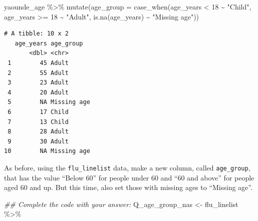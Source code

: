 \documentclass[
  letterpaper,
  DIV=11,
  numbers=noendperiod]{scrreprt}
\newenvironment{Shaded}{\begin{snugshade}}{\end{snugshade}}
\newcommand{\AttributeTok}[1]{\textcolor[rgb]{0.40,0.45,0.13}{#1}}
\newcommand{\DecValTok}[1]{\textcolor[rgb]{0.68,0.00,0.00}{#1}}
\newcommand{\DocumentationTok}[1]{\textcolor[rgb]{0.37,0.37,0.37}{\textit{#1}}}
\newcommand{\FunctionTok}[1]{\textcolor[rgb]{0.28,0.35,0.67}{#1}}
\newcommand{\NormalTok}[1]{\textcolor[rgb]{0.00,0.23,0.31}{#1}}
\newcommand{\OtherTok}[1]{\textcolor[rgb]{0.00,0.23,0.31}{#1}}
\newcommand{\SpecialCharTok}[1]{\textcolor[rgb]{0.37,0.37,0.37}{#1}}
\newcommand{\StringTok}[1]{\textcolor[rgb]{0.13,0.47,0.30}{#1}}
\begin{document}
\begin{Shaded}
\begin{Highlighting}[]
\NormalTok{yaounde\_age }\SpecialCharTok{\%\textgreater{}\%}  
  \FunctionTok{mutate}\NormalTok{(}\AttributeTok{age\_group =} \FunctionTok{case\_when}\NormalTok{(age\_years }\SpecialCharTok{\textless{}} \DecValTok{18} \SpecialCharTok{\textasciitilde{}} \StringTok{"Child"}\NormalTok{, }
\NormalTok{                               age\_years }\SpecialCharTok{\textgreater{}=} \DecValTok{18} \SpecialCharTok{\textasciitilde{}} \StringTok{"Adult"}\NormalTok{, }
                               \FunctionTok{is.na}\NormalTok{(age\_years) }\SpecialCharTok{\textasciitilde{}} \StringTok{"Missing age"}\NormalTok{))}
\end{Highlighting}
\end{Shaded}

\begin{verbatim}
# A tibble: 10 x 2
   age_years age_group  
       <dbl> <chr>      
 1        45 Adult      
 2        55 Adult      
 3        23 Adult      
 4        20 Adult      
 5        NA Missing age
 6        17 Child      
 7        13 Child      
 8        28 Adult      
 9        30 Adult      
10        NA Missing age
\end{verbatim}

\begin{tcolorbox}[enhanced jigsaw, title=\textcolor{quarto-callout-tip-color}{\faLightbulb}\hspace{0.5em}{Practice}, colbacktitle=quarto-callout-tip-color!10!white, leftrule=.75mm, arc=.35mm, opacityback=0, bottomrule=.15mm, rightrule=.15mm, toptitle=1mm, breakable, toprule=.15mm, colback=white, coltitle=black, colframe=quarto-callout-tip-color-frame, bottomtitle=1mm, titlerule=0mm, left=2mm, opacitybacktitle=0.6]

As before, using the \texttt{flu\_linelist} data, make a new column,
called \texttt{age\_group}, that has the value ``Below 60'' for people
under 60 and ``60 and above'' for people aged 60 and up. But this time,
also set those with missing ages to ``Missing age''.

\begin{Shaded}
\begin{Highlighting}[]
\DocumentationTok{\#\# Complete the code with your answer:}
\NormalTok{Q\_age\_group\_nas }\OtherTok{\textless{}{-}} 
\NormalTok{  flu\_linelist }\SpecialCharTok{\%\textgreater{}\%} 
\end{Highlighting}
\end{Shaded}

\end{tcolorbox}
\end{document}
